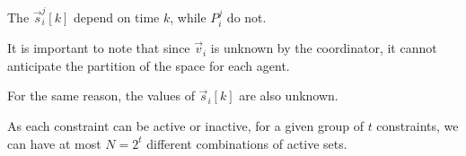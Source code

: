 \documentclass{ifacconf}  %
\begin{document}









\begin{remark}\label{rmk:P_constant}
The $\vec{s}_{i}^{j}[k]$ depend on time $k$, while $P_{i}^{j}$ do not.
\end{remark}


\begin{challenge}\label{ch:zone_unknown}
  It is important to note that since $\vec{v}_{i}$ is unknown by the coordinator, it cannot anticipate the partition of the space for each agent.
\end{challenge}
\begin{challenge}\label{ch:s_unknown}
 For the same reason, the values of $\vec{s}_{i}[k]$ are also unknown.
\end{challenge}

 As each constraint can be active or inactive, for a given group of $t$ constraints, we can have at most ${N=2^{t}}$ different combinations of active sets.
\end{document}
